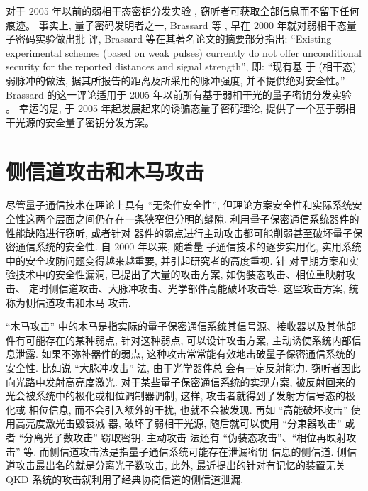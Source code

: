 对于 2005 年以前的弱相干态密钥分发实验 \cite{Kimura2004}, 窃听者可获取全部信息而不留下任何痕迹。 事实上, 量子密码发明者之一, Brassard 等 \cite{Huttner1995},\cite{Brassard2000} 早在 2000 年就对弱相干态量子密码实验做出批 评, Brassard 等在其著名论文的摘要部分指出: “Existing experimental schemes (based on weak pulses) currently do not offer unconditional security for the reported distances and signal strength”, 即: “现有基 于 (相干态) 弱脉冲的做法, 据其所报告的距离及所采用的脉冲强度, 并不提供绝对安全性。” Brassard 的这一评论适用于 2005 年以前所有基于弱相干光的量子密钥分发实验 \cite{Kimura2004}。 幸运的是, 于 2005 年起发展起来的诱骗态量子密码理论, 提供了一个基于弱相干光源的安全量子密钥分发方案。

\section{侧信道攻击和木马攻击}
尽管量子通信技术在理论上具有 “无条件安全性”, 但理论方案安全性和实际系统安全性这两个层面之间仍存在一条狭窄但分明的缝隙. 利用量子保密通信系统器件的性能缺陷进行窃听, 或者针对 器件的弱点进行主动攻击都可能削弱甚至破坏量子保密通信系统的安全性. 自 2000 年以来, 随着量 子通信技术的逐步实用化, 实用系统中的安全攻防问题变得越来越重要, 并引起研究者的高度重视. 针 对早期方案和实验技术中的安全性漏洞, 已提出了大量的攻击方案, 如伪装态攻击、相位重映射攻击、 定时侧信道攻击、大脉冲攻击、光学部件高能破坏攻击等. 这些攻击方案, 统称为侧信道攻击和木马 攻击.

“木马攻击” 中的木马是指实际的量子保密通信系统其信号源、接收器以及其他部件有可能存在的某种弱点, 针对这种弱点, 可以设计攻击方案, 主动诱使系统内部信息泄露. 如果不弥补器件的弱点, 这种攻击常常能有效地击破量子保密通信系统的安全性. 比如说 “大脉冲攻击” 法, 由于光学器件总 会有一定反射能力. 窃听者因此向光路中发射高亮度激光. 对于某些量子保密通信系统的实现方案, 被反射回来的光会被系统中的极化或相位调制器调制, 这样, 攻击者就得到了发射方信号态的极化或 相位信息, 而不会引入额外的干扰, 也就不会被发现. 再如 “高能破坏攻击” 使用高亮度激光击毁衰减 器, 破坏了弱相干光源, 随后就可以使用 “分束器攻击” 或者 “分离光子数攻击” 窃取密钥. 主动攻击 法还有 “伪装态攻击”、“相位再映射攻击” 等. 而侧信道攻击法是指量子通信系统可能存在泄漏密钥 信息的侧信道. 侧信道攻击最出名的就是分离光子数攻击, 此外, 最近提出的针对有记忆的装置无关 QKD 系统的攻击就利用了经典协商信道的侧信道泄漏.